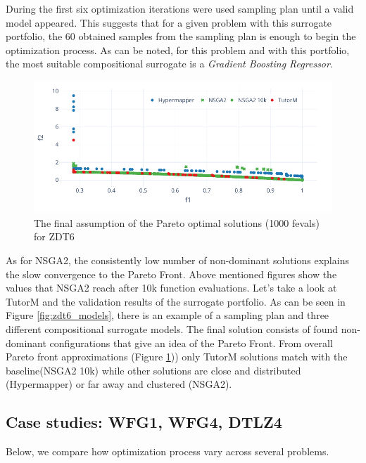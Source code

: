     During the first six optimization iterations were used sampling plan until a valid model appeared. This suggests that for a given problem with this surrogate portfolio, the 60 obtained samples from the sampling plan is enough to begin the optimization process. As can be noted, for this problem and with this portfolio, the most suitable compositional surrogate is a \emph{Gradient Boosting Regressor}. 
    
            \begin{figure}
                \centering   
                \includegraphics[width=\textwidth]{content/images/zdt6_front}
                \caption[The final assumption of the Pareto optimal solutions (1000 fevals) for ZDT6]{The final assumption of the Pareto optimal solutions (1000 fevals) for ZDT6}
                \label{fig:zdt6_front}
            \end{figure}

	As for NSGA2, the consistently low number of non-dominant solutions explains the slow convergence to the Pareto Front. Above mentioned figures show the values that  NSGA2 reach after 10k function evaluations.
    Let's take a look at TutorM and the validation results of the surrogate portfolio. As can be seen in Figure \ref{fig:zdt6_models}, there is an example of a sampling plan and three different compositional surrogate models. The final solution consists of found non-dominant configurations that give an idea of the Pareto Front. From overall Pareto front approximations (Figure \ref{fig:zdt6_front})) only TutorM solutions match with the baseline(NSGA2 10k) while other solutions are close and distributed (Hypermapper) or far away and clustered (NSGA2).

    \subsection*{Case studies: WFG1, WFG4, DTLZ4}
    Below, we compare how optimization process vary across several problems.

